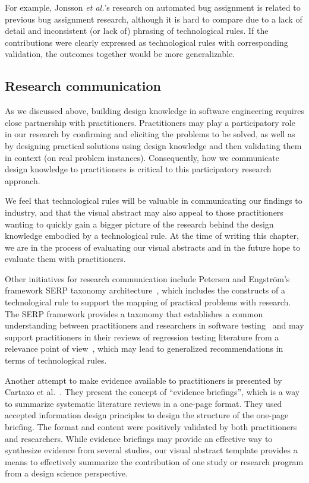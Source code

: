 \documentclass[graybox]{svmult}
\begin{document}
For example, Jonsson \emph{et al.}'s research on automated bug assignment is related to previous bug assignment research, although it is hard to compare due to a lack of detail and inconsistent (or lack of) phrasing of technological rules. If the contributions were clearly expressed as technological rules with corresponding validation, the outcomes together would be more generalizable.



\subsection{Research communication}
\label{sec:communication}

As we discussed above, building design knowledge in software engineering requires close partnership with practitioners. 
Practitioners may play a participatory role in our research by confirming and eliciting the problems to be solved, as well as by designing practical solutions using design knowledge and then validating them in context (on real problem instances). 
Consequently, how we communicate design knowledge to practitioners is critical to this participatory research approach.

We feel that technological rules will be valuable in communicating our findings to industry, and that the visual abstract may also appeal to those practitioners wanting to quickly gain a bigger picture of the research behind the design knowledge embodied by a technological rule. 
At the time of writing this chapter, we are in the process of evaluating our visual abstracts and in the future hope to evaluate them with practitioners.


Other initiatives for research communication include Petersen and Engstr\"om's framework SERP taxonomy architecture~\cite{petersen_finding_2014}, which includes the constructs of a technological rule  
to support the mapping of practical problems with research. 
The SERP framework provides a taxonomy that establishes a common understanding between practitioners and researchers in software testing~\cite{engstrom_SERP-test_2017} and may support practitioners in their reviews of regression testing literature from a relevance point of view~\cite{ali_search_2019}, which may lead to generalized recommendations in terms of technological rules. 

Another attempt to make evidence available to practitioners is presented by Cartaxo et al.~\cite{Cartaxo2016}. 
They present the concept of ``evidence briefings'', which is a way to summarize systematic literature reviews in a one-page format. 
They used accepted information design principles to design the structure of the one-page briefing. The format and content were positively validated by both practitioners and researchers. While evidence briefings may provide an effective way to synthesize evidence from several studies, our visual abstract template provides a means to effectively summarize the contribution of one study or research program from a design science perspective.
\end{document}
